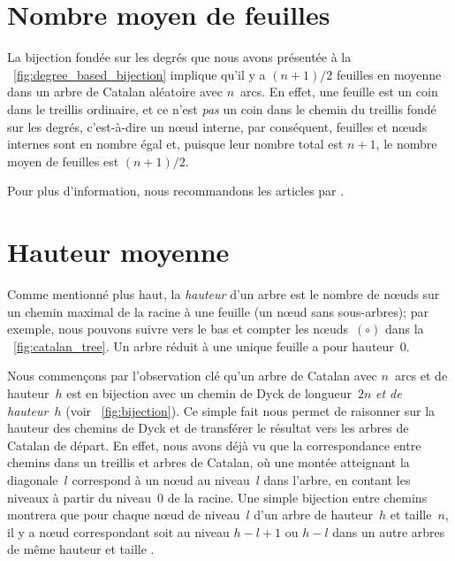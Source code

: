 \section{Nombre moyen de feuilles}

La bijection fondée sur les degrés que nous avons présentée à la
\fig~\vref{fig:degree_based_bijection} implique qu'il y a \((n+1)/2\)
feuilles en moyenne dans un arbre de Catalan aléatoire avec
\(n\)~arcs. En effet, une feuille est un coin dans le treillis
ordinaire, et ce n'est \emph{pas} un coin dans le chemin du treillis
fondé sur les degrés, c'est-à-dire un nœud interne, par conséquent,
feuilles et nœuds internes sont en nombre égal et, puisque leur nombre
total est \(n+1\), le nombre moyen de feuilles est \((n+1)/2\).

Pour plus d'information, nous recommandons les articles par
\citet*{DershwowitzZaks_1980,DershowitzZaks_1981,DershowitzZaks_1990}.

\section{Hauteur moyenne}
\label{sec:Catalan_height}

Comme mentionné plus haut, la \emph{hauteur} d'un arbre est le nombre
de nœuds sur un chemin maximal de la racine à une feuille (un nœud
sans sous-arbres); par exemple, nous pouvons suivre vers le bas et
compter les nœuds~\((\circ)\) dans la \fig~\ref{fig:catalan_tree}. Un
arbre réduit à une unique feuille a pour hauteur~\(0\).

Nous commençons par l'observation clé qu'un arbre de Catalan avec
\(n\)~arcs et de hauteur~\(h\) est en bijection avec un chemin de Dyck
de longueur~\(2n\) \emph{et de hauteur~\(h\)} (voir
\fig~\vref{fig:bijection}). Ce simple fait nous permet de raisonner
sur la hauteur des chemins de Dyck et de transférer le résultat vers
les arbres de Catalan de départ. En effet, nous avons déjà vu que la
correspondance entre chemins dans un treillis et arbres de Catalan, où
une montée atteignant la diagonale~\(l\) correspond à un nœud au
niveau~\(l\) dans l'arbre, en contant les niveaux à partir du
niveau~\(0\) de la racine. Une simple bijection entre chemins montrera
que pour chaque nœud de niveau~\(l\) d'un arbre de hauteur~\(h\) et
taille~\(n\), il y a nœud correspondant soit au niveau \(h-l+1\) ou
\(h-l\) dans un autre arbres de même hauteur et taille
\citep{Rinderknecht_2013d}.

